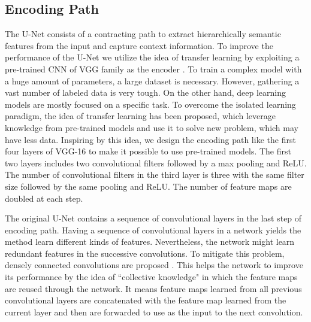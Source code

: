 \documentclass[journal]{IEEEtran}
\begin{document}
\subsection{Encoding Path}
The U-Net consists of a contracting path to extract hierarchically semantic features from the input and capture context information. To improve the performance of the U-Net we utilize the idea of transfer learning by exploiting a pre-trained CNN of VGG family as the encoder \cite{van2014transfer}. To train a complex model with a huge amount of parameters, a large dataset is necessary. However, gathering a vast number of labeled data is very tough. On the other hand, deep learning models are mostly focused on a specific task.  
To overcome the isolated learning paradigm, the idea of transfer learning has been proposed, which leverage knowledge from pre-trained models and use it to solve new problem, which may have less data.  Inspiring by this idea, we design the encoding path like the first four layers of VGG-16 to make it possible to use pre-trained models.
The first two layers includes  two convolutional  filters followed by a  max pooling and ReLU. The number of convolutional filters in the third layer is three with the same filter size followed by the same pooling and ReLU. The number of feature maps are doubled at each step. 





The original U-Net contains a sequence of convolutional layers in the last step of encoding path.
Having a sequence of convolutional layers in a network yields the method learn different kinds of features. Nevertheless, the network might learn redundant features in the successive convolutions. To mitigate this problem, densely connected convolutions are proposed \cite{huang2017densely}. This helps the network to improve its performance by the idea of ``collective knowledge" in which the feature maps are reused through the network. It means feature maps learned from all previous convolutional layers are concatenated with the feature map learned from the current layer and then are forwarded to use as the input to the next convolution.
\end{document}
